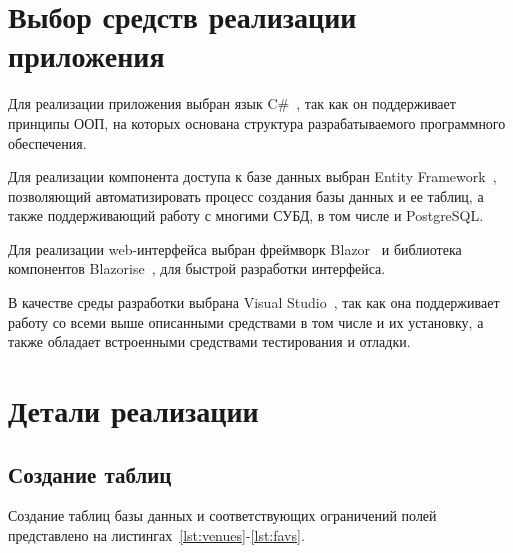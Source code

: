 \section{Выбор средств реализации приложения}

Для реализации приложения выбран язык C\#~\cite{site14}, так как он поддерживает
принципы ООП, на которых основана структура разрабатываемого программного
обеспечения. 

Для реализации компонента доступа к базе данных выбран Entity
Framework~\cite{site15}, позволяющий автоматизировать процесс создания базы
данных и ее таблиц, а также поддерживающий работу с многими СУБД, в том числе и
PostgreSQL.

Для реализации web-интерфейса выбран фреймворк Blazor~\cite{site16} и библиотека
компонентов Blazorise~\cite{site17}, для быстрой разработки интерфейса.

В качестве среды разработки выбрана Visual Studio~\cite{site18}, так как она
поддерживает работу со всеми выше описанными средствами в том числе и их
установку, а также обладает встроенными средствами тестирования и отладки.

\section{Детали реализации}

\subsection{Создание таблиц}

Создание таблиц базы данных и соответствующих ограничений полей представлено на
листингах~\ref{lst:venues}-\ref{lst:favs}.

{
\captionsetup{format=hang,justification=raggedright,
              singlelinecheck=off,width=16cm}


\clearpage



\clearpage
{}



\clearpage
{}

}

